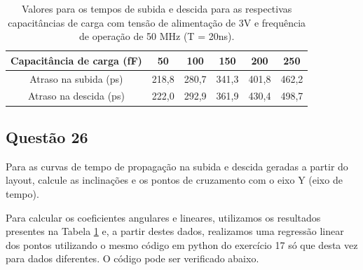 \documentclass[12pt,a4paper]{article}
\begin{document}
\begin{table}[H]
    \centering
    \caption{Valores para os tempos de subida e descida para as respectivas capacitâncias de carga com tensão de alimentação de 3V e frequência de operação de 50 MHz (T = 20ns).}
    \label{tab:inverter_delay_values}
    \begin{tabular}{cccccc}
        \toprule
        Capacitância de carga (fF) & 50 & 100 & 150 & 200 & 250 \\
        \midrule
        Atraso na subida (ps) & 218,8 & 280,7 & 341,3 & 401,8 & 462,2 \\
        Atraso na descida (ps) & 222,0 & 292,9 & 361,9 & 430,4 & 498,7 \\
        \bottomrule
    \end{tabular}
\end{table}

\subsection*{Questão 26}

Para as curvas de tempo de propagação na subida e descida geradas a partir do layout, calcule as inclinações e os pontos de cruzamento com o eixo Y (eixo de tempo).

Para calcular os coeficientes angulares e lineares, utilizamos os resultados presentes na Tabela \ref{tab:inverter_delay_values} e, a partir destes dados, realizamos uma regressão linear dos pontos utilizando o mesmo código em python do exercício 17 só que desta vez para dados diferentes. O código pode ser verificado abaixo.
\end{document}

